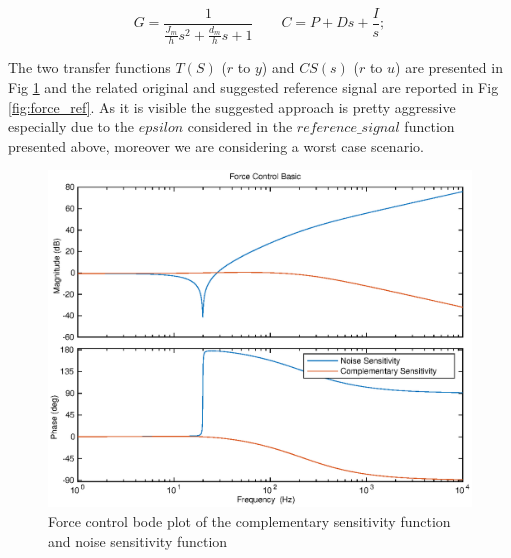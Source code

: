 \documentclass[a4paper,11pt]{article}
\begin{document}
\[
G = \frac{1}{\frac{J_m}{h}s^2 + \frac{d_m}{h}s + 1} \qquad
C = P + Ds + \frac{I}{s};                             
\]

\bigskip
\noindent The two transfer functions $T(S)$ ($r$ to $y$) and $CS(s)$ ($r$ to $u$) are presented in Fig \ref{fig:force_tf} and the related original and suggested reference signal are reported in Fig \ref{fig:force_ref}. As it is visible the suggested approach is pretty aggressive especially due to the $epsilon$ considered in the $reference\_signal$ function presented above, moreover we are considering a worst case scenario.

\bigskip
\begin{figure}[H]
\begin{center}
\includegraphics[width=1.0\textwidth]{images/force_tf.eps}
\end{center}
\caption{Force control bode plot of the complementary sensitivity function and noise sensitivity function}
\label{fig:force_tf}
\end{figure}
\end{document}
